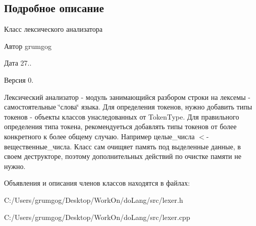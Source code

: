 \subsection{Подробное описание}
Класс лексического анализатора 

\begin{DoxyAuthor}{Автор}
grumgog 
\end{DoxyAuthor}
\begin{DoxyDate}{Дата}
27.. 
\end{DoxyDate}
\begin{DoxyVersion}{Версия}
0.
\end{DoxyVersion}
Лексический анализатор -\/ модуль занимающийся разбором строки на лексемы -\/ самостоятельные \char`\"{}слова\char`\"{} языка. Для определения токенов, нужно добавить типы токенов -\/ объекты классов унаследованных от Token\+Type. Для правильного определения типа токена, рекомендуеться добавлять типы токенов от более конкретного к более общему случаю. Например целые\+\_\+числа $<$-\/ вещественные\+\_\+числа. Класс сам очищяет память под выделенные данные, в своем деструкторе, поэтому дополнительных действий по очистке памяти не нужно. 

Объявления и описания членов классов находятся в файлах\+:\begin{DoxyCompactItemize}
\item 
C\+:/\+Users/grumgog/\+Desktop/\+Work\+On/do\+Lang/src/lexer.\+h\item 
C\+:/\+Users/grumgog/\+Desktop/\+Work\+On/do\+Lang/src/lexer.\+cpp\end{DoxyCompactItemize}
